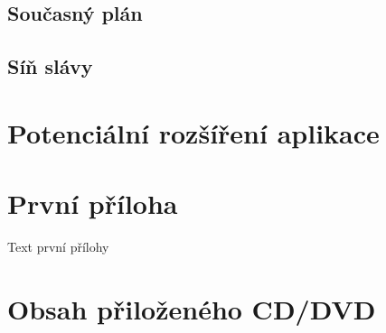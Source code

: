 \documentclass[
  field=inf,
  biblatex,
  glossaries,
  index
]{kidiplom}
\begin{document}
\subsection{Současný plán}

\subsection{\clqq Síň slávy\crqq}

\section{Potenciální rozšíření aplikace}

\appendix

\section{První příloha}
Text první přílohy

\section{Obsah přiloženého CD/DVD} \label{sec:ObsahCD}



\printglossary


\nocite{*}
\printbibliography

 \begin{thebibliography}{9}



 \end{thebibliography}

\printindex
\end{document}
